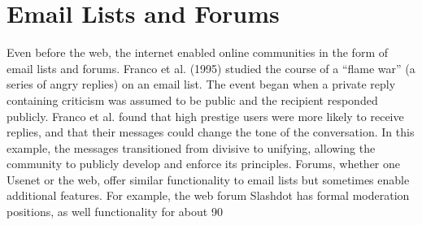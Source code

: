 \section{Email Lists and Forums}
Even before the web, the internet enabled online communities in the form of email lists and forums. Franco et al. (1995) studied the course of a “flame war” (a series of angry replies) on an email list. The event began when a private reply containing criticism was assumed to be public and the recipient responded publicly. Franco et al. found that high prestige users were more likely to receive replies, and that their messages could change the tone of the conversation. In this example, the messages transitioned from divisive to unifying, allowing the community to publicly develop and enforce its principles. Forums, whether one Usenet or the web, offer similar functionality to email lists but sometimes enable additional features. For example, the web forum Slashdot has formal moderation positions, as well functionality for about 90%

